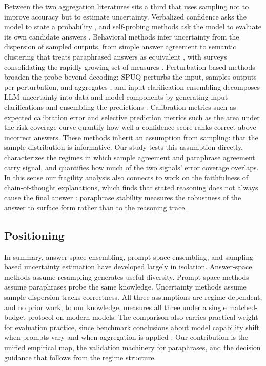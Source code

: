 Between the two aggregation literatures sits a third that uses sampling not to improve accuracy but to estimate uncertainty. Verbalized confidence asks the model to state a probability \citep{tian2023just,xiong2024can}, and self-probing methods ask the model to evaluate its own candidate answers \citep{kadavath2022language}. Behavioral methods infer uncertainty from the dispersion of sampled outputs, from simple answer agreement to semantic clustering that treats paraphrased answers as equivalent \citep{kuhn2023semantic,farquhar2024detecting}, with surveys consolidating the rapidly growing set of measures \citep{liu2025uqsurvey}. Perturbation-based methods broaden the probe beyond decoding: SPUQ perturbs the input, samples outputs per perturbation, and aggregates \citep{gao2024spuq}, and input clarification ensembling decomposes LLM uncertainty into data and model components by generating input clarifications and ensembling the predictions \citep{hou2023decomposing}. Calibration metrics such as expected calibration error \citep{guo2017calibration} and selective prediction metrics such as the area under the risk-coverage curve quantify how well a confidence score ranks correct above incorrect answers. These methods inherit an assumption from sampling: that the sample distribution is informative. Our study tests this assumption directly, characterizes the regimes in which sample agreement and paraphrase agreement carry signal, and quantifies how much of the two signals' error coverage overlaps. In this sense our fragility analysis also connects to work on the faithfulness of chain-of-thought explanations, which finds that stated reasoning does not always cause the final answer \citep{lanham2023measuring}: paraphrase stability measures the robustness of the answer to surface form rather than to the reasoning trace.

\subsection{Positioning}

In summary, answer-space ensembling, prompt-space ensembling, and sampling-based uncertainty estimation have developed largely in isolation. Answer-space methods assume resampling generates useful diversity. Prompt-space methods assume paraphrases probe the same knowledge. Uncertainty methods assume sample dispersion tracks correctness. All three assumptions are regime dependent, and no prior work, to our knowledge, measures all three under a single matched-budget protocol on modern models. The comparison also carries practical weight for evaluation practice, since benchmark conclusions about model capability shift when prompts vary \citep{mizrahi2024state} and when aggregation is applied \citep{wang2023selfconsistency}. Our contribution is the unified empirical map, the validation machinery for paraphrases, and the decision guidance that follows from the regime structure.
